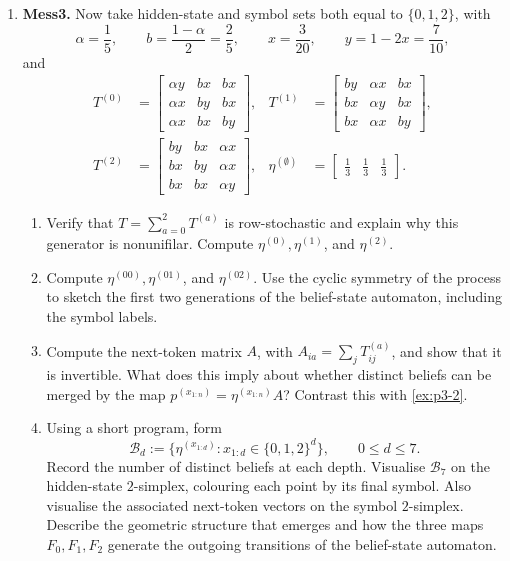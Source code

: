 \begin{exercise}
\begin{enumerate}
    \item \textbf{Mess3.}
      Now take hidden-state and symbol sets both equal to $\{0,1,2\}$, with
      \[
        \alpha=\frac15,\qquad b=\frac{1-\alpha}{2}=\frac25,
        \qquad x=\frac3{20},\qquad y=1-2x=\frac7{10},
      \]
      and
      \[
        \begin{aligned}
          T^{(0)}&=
          \begin{bmatrix}
            \alpha y&bx&bx\\ \alpha x&by&bx\\ \alpha x&bx&by
          \end{bmatrix},&
          T^{(1)}&=
          \begin{bmatrix}
            by&\alpha x&bx\\ bx&\alpha y&bx\\ bx&\alpha x&by
          \end{bmatrix},\\[1mm]
          T^{(2)}&=
          \begin{bmatrix}
            by&bx&\alpha x\\ bx&by&\alpha x\\ bx&bx&\alpha y
          \end{bmatrix},&
          \eta^{(\emptyset)}&=
          \begin{bmatrix}\tfrac13&\tfrac13&\tfrac13\end{bmatrix}.
        \end{aligned}
      \]
      \begin{enumerate}
        \item Verify that $T=\sum_{a=0}^2T^{(a)}$ is row-stochastic and
          explain why this generator is nonunifilar. Compute
          $\eta^{(0)},\eta^{(1)}$, and $\eta^{(2)}$.

        \item Compute $\eta^{(00)},\eta^{(01)}$, and $\eta^{(02)}$. Use the
          cyclic symmetry of the process to sketch the first two generations
          of the belief-state automaton, including the symbol labels.

        \item Compute the next-token matrix $A$, with
          $A_{ia}=\sum_jT^{(a)}_{ij}$, and show that it is invertible. What
          does this imply about whether distinct beliefs can be merged by the
          map $p^{(x_{1:n})}=\eta^{(x_{1:n})}A$? Contrast this with \cref{ex:p3-2}.

        \item Using a short program, form
          \[
            \mathcal B_d:=
            \bigl\{\eta^{(x_{1:d})}:x_{1:d}\in\{0,1,2\}^d\bigr\},
            \qquad 0\leq d\leq7.
          \]
          Record the number of distinct beliefs at each depth. Visualise
          $\mathcal B_7$ on the hidden-state $2$-simplex, colouring each point
          by its final symbol. Also visualise the associated next-token
          vectors on the symbol $2$-simplex. Describe the geometric structure
          that emerges and how the three maps $F_0,F_1,F_2$ generate the
          outgoing transitions of the belief-state automaton.


\end{enumerate}
\end{enumerate}
\end{exercise}
